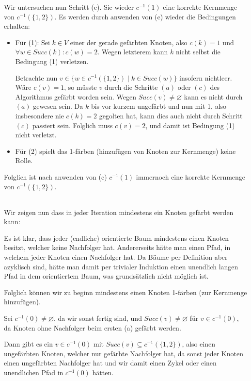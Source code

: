 \documentclass[a4paper,graphics,11pt]{article}
\begin{document}
Wir untersuchen nun Schritt (c). Sie wieder $c^{-1}(1)$ eine korrekte Kernmenge von $c^{-1}(\{1,2\})$.
Es werden durch anwenden von (c) wieder die Bedingungen erhalten:
\begin{itemize}
    \item Für (1): Sei $k \in V$ einer der gerade gefärbten Knoten, also $c(k) = 1$ und $\forall w \in Succ(k): c(w) = 2$.
        Wegen letzterem kann $k$ nicht selbst die Bedingung (1) verletzen.

        Betrachte nun $v \in \{w \in c^{-1}(\{1,2\}) \mid k \in Succ(w)\}$ insofern nichtleer. Wäre $c(v) = 1$, so müsste
        $v$ durch die Schritte $(a)$ oder $(c)$ des Algorithmus gefärbt worden sein.
        Wegen $Succ(v) \neq \varnothing$ kann es nicht durch $(a)$ gewesen sein. Da $k$ bis vor kurzem
        ungefärbt und nun mit 1, also insbesondere nie $c(k) = 2$ gegolten hat, kann dies auch nicht
        durch Schritt $(c)$ passiert sein.
        Folglich muss $c(v) = 2$, und damit ist Bedingung (1) nicht verletzt.

    \item Für (2) spielt das 1-färben (hinzufügen von Knoten zur Kernmenge) keine Rolle.

\end{itemize}
Folglich ist nach anwenden von (c) $c^{-1}(1)$ immernoch eine korrekte Kernmenge von $c^{-1}(\{1,2\})$.

\strut\\

Wir zeigen nun dass in jeder Iteration mindestens ein Knoten gefärbt werden kann:

Es ist klar, dass jeder (endliche) orientierte Baum mindestens einen Knoten besitzt, welcher keine Nachfolger hat.
Andererseits hätte man einen Pfad, in welchem jeder Knoten einen Nachfolger hat. Da Bäume per Definition aber
azyklisch sind, hätte man damit per trivialer Induktion einen unendlich langen Pfad in dem orientiertem Baum,
was grundsätzlich nicht möglich ist.

Folglich können wir zu beginn mindestens einen Knoten 1-färben (zur Kernmenge hinzufügen).

Sei $c^{-1}(0) \neq \varnothing$, da wir sonst fertig sind, und $Succ(v) \neq \varnothing$ für $v \in c^{-1}(0)$,
da Knoten ohne Nachfolger beim ersten (a) gefärbt werden.

Dann gibt es ein $v \in c^{-1}(0)$ mit $Succ(v) \subseteq c^{-1}(\{1,2\})$, also einen ungefärbten Knoten, welcher
nur gefärbte Nachfolger hat, da sonst jeder Knoten einen ungefärbten Nachfolger hat und wir damit einen Zykel oder einen
unendlichen Pfad in $c^{-1}(0)$ hätten.
\end{document}
